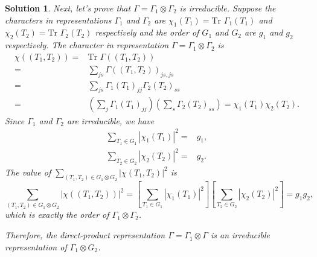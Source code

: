 \documentclass[UTF8,10pt,a4paper]{article}
\theoremstyle{Problem}
\theoremstyle{Solution}
\newtheorem*{sol}{Solution}
\newcommand{\Tr}{\text{Tr }}
\providecommand{\abs}[1]{\left\lvert#1\right\rvert}
\begin{document}
\begin{sol}
    Next, let's prove that $\Gamma=\Gamma_1\otimes\Gamma_2$ is irreducible. Suppose the characters in representations $\Gamma_1$ and $\Gamma_2$ are $\chi_1(T_1)=\Tr\Gamma_1(T_1)$ and $\chi_2(T_2)=\Tr\Gamma_2(T_2)$ respectively and the order of $G_1$ and $G_2$ are $g_1$ and $g_2$ respectively. The character in representation $\Gamma=\Gamma_1\otimes\Gamma_2$ is
    \begin{align}
        \nonumber\chi((T_1,T_2))=&\Tr\Gamma((T_1,T_2))\\
        \nonumber=&\sum_{js}\Gamma((T_1,T_2))_{js,js}\\
        \nonumber=&\sum_{js}\Gamma_1(T_1)_{jj}\Gamma_2(T_2)_{ss}\\
        =&\left(\sum_j\Gamma_1(T_1)_{jj}\right)\left(\sum_s\Gamma_2(T_2)_{ss}\right)=\chi_1(T_1)\chi_2(T_2).
    \end{align}
    Since $\Gamma_1$ and $\Gamma_2$ are irreducible, we have
    \begin{align}
        \sum_{T_1\in G_1}\abs{\chi_1(T_1)}^2=&g_1,\\
        \sum_{T_2\in G_2}\abs{\chi_2(T_2)}^2=&g_2.
    \end{align}
    The value of $\sum_{(T_1,T_2)\in G_1\otimes G_2}\abs{\chi(T_1,T_2)}^2$ is
    \begin{equation}
        \sum_{(T_1,T_2)\in G_1\otimes G_2}\abs{\chi((T_1,T_2))}^2=\left[\sum_{T_1\in G_1}\abs{\chi_1(T_1)}^2\right]\left[\sum_{T_2\in G_2}\abs{\chi_2(T_2)}^2\right]=g_1g_2,
    \end{equation}
    which is exactly the order of $\Gamma_1\otimes\Gamma_2$.

    Therefore, the direct-product representation $\Gamma=\Gamma_1\otimes\Gamma$ is an irreducible representation of $\Gamma_1\otimes G_2$.
\end{sol}
\end{document}
